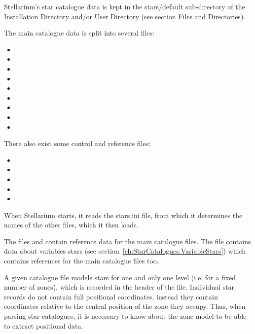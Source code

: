 Stellarium's star catalogue data is kept in the stars/default
sub-directory of the Installation Directory and/or User Directory (see
section \href{Advanced_Use\#Files_and_Directories}{Files and
Directories}).

The main catalogue data is split into several files:

\begin{itemize}
\item {}
\item {}
\item {}
\item {}
\item {}
\item {}
\item {}
\item {}
\item {}
\end{itemize}

There also exist some control and reference files:

\begin{itemize}
\item {}
\item {}
\item {}
\item {}
\item {}
\end{itemize}

When Stellarium starts, it reads the stars.ini file, from which it
determines the names of the other files, which it then loads.

The files  and 
contain reference data for the main catalogue files. The
file  contains data about variables stars
(see section~\ref{ch:StarCatalogues:VariableStars}) which contains references for
the main catalogue files too.

A given catalogue file models stars for one and only one level (i.e. for
a fixed number of zones), which is recorded in the header of the file.
Individual star records do not contain full positional coordinates,
instead they contain coordinates relative to the central position of the
zone they occupy. Thus, when parsing star catalogues, it is necessary to
know about the zone model to be able to extract positional data.

